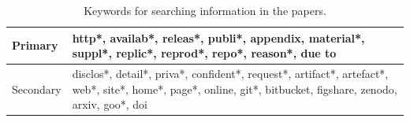 \documentclass{article}
\begin{document}

\setcounter{table}{1}%

\begin{table}[htbp]
    \caption{Keywords for searching information in the papers.}
    \label{tab:keywords}
    \centering
    \small
    \begin{tabular}{@{}lp{10cm}@{}}
        \toprule
        \multirow{2}{*}{Primary} & 
        http*,
        availab*,
        releas*,
        publi*,
        appendix,
        material*,
        suppl*,
        replic*,
        reprod*,
        repo*,
        reason*,
        due to\\

\midrule
        
        \multirow{2}{*}{Secondary} &
        disclos*,
        detail*,
        priva*,
        confident*,
        request*,
        artifact*,
        artefact*,
        web*,
        site*,
        home*,
        page*,
        online,
        git*,
        bitbucket,
        figshare,
        zenodo,
        arxiv,
        goo*,
        doi \\

        \bottomrule
    \end{tabular}
\end{table}
\end{document}

